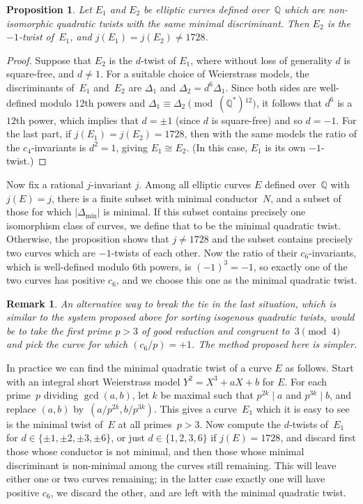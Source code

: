 \documentclass{article}
\newtheorem{prop}[thm]{Proposition}
\newtheorem{rem}[thm]{Remark}
\def\Q{{\mathbb Q}}
\begin{document}
\begin{prop} Let $E_1$ and $E_2$ be elliptic curves defined over~$\Q$
  which are non-isomorphic quadratic twists with the same minimal
  discriminant.  Then $E_2$ is the $-1$-twist of~$E_1$, and
  $j(E_1)=j(E_2)\not=1728$.
\end{prop}
\begin{proof}
Suppose that $E_2$ is the $d$-twist of $E_1$, where without loss of
generality $d$ is square-free, and $d\not=1$.  For a suitable choice
of Weierstrass models, the discriminants of~$E_1$ and~$E_2$ are
$\Delta_1$ and $\Delta_2=d^6\Delta_1$.  Since both sides are
well-defined modulo $12$th powers and
$\Delta_1\equiv\Delta_2\pmod{(\Q^*){}^{12}}$, it follows that $d^6$ is a
$12$th power, which implies that $d=\pm1$ (since $d$ is square-free)
and so $d=-1$.  For the last part, if $j(E_1)=j(E_2)=1728$, then with
the same models the ratio of the $c_4$-invariants is $d^2=1$, giving
$E_1\cong E_2$.  (In this case, $E_1$ is its own $-1$-twist.)
\end{proof}

Now fix a rational $j$-invariant $j$.  Among all elliptic curves $E$
defined over~$\Q$ with $j(E)=j$, there is a finite subset with minimal
conductor~$N$, and a subset of those for which
$\left|\Delta_{\text{min}}\right|$ is minimal.  If this subset
contains precisely one isomorphism class of curves, we define that to
be the minimal quadratic twist.  Otherwise, the proposition shows that
$j\not=1728$ and the subset contains precisely two curves which are
$-1$-twists of each other.  Now the ratio of their $c_6$-invariants,
which is well-defined modulo $6$th powers, is $(-1)^3=-1$, so exactly
one of the two curves has positive $c_6$, and we choose this one as
the minimal quadratic twist.

\begin{rem}
An alternative way to break the tie in the last situation, which is
similar to the system proposed above for sorting isogenous quadratic
twists, would be to take the first prime $p>3$ of good reduction and
congruent to~$3\pmod4$ and pick the curve for which $(c_6/p)=+1$.  The
method proposed here is simpler.
\end{rem}

In practice we can find the minimal quadratic twist of a curve $E$ as
follows.  Start with an integral short Weierstrass model
$Y^2=X^3+aX+b$ for $E$.  For each prime~$p$ dividing $\gcd(a,b)$, let
$k$ be maximal such that $p^{2k}\mid a$ and $p^{3k}\mid b$, and
replace $(a,b)$ by~$(a/p^{2k},b/p^{3k})$.  This gives a curve~$E_1$
which it is easy to see is the minimal twist of~$E$ at all
primes~$p>3$.  Now compute the $d$-twists of~$E_1$ for
$d\in\{\pm1,\pm2,\pm3,\pm6\}$, or just $d\in\{1,2,3,6\}$ if
$j(E)=1728$, and discard first those whose conductor is not minimal,
and then those whose minimal discriminant is non-minimal among the
curves still remaining. This will leave either one or two curves
remaining; in the latter case exactly one will have positive $c_6$, we
discard the other, and are left with the minimal quadratic twist.
\end{document}
